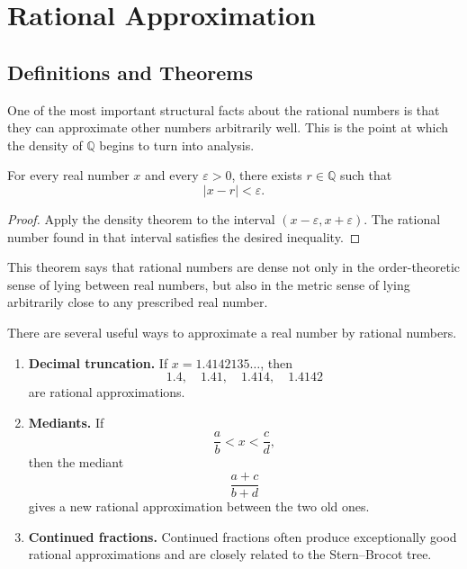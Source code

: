 
\section{Rational Approximation}
\label{sec:rational-approximation}

\subsection{Definitions and Theorems}

One of the most important structural facts about the rational numbers is that they can approximate
other numbers arbitrarily well.  This is the point at which the density of $\mathbb{Q}$ begins to turn
into analysis.

\begin{theorem}
\label{thm:rational-approximation}
For every real number $x$ and every $\varepsilon>0$, there exists $r\in\mathbb{Q}$ such that
\[
|x-r|<\varepsilon.
\]
\end{theorem}

\begin{proof}
Apply the density theorem to the interval $(x-\varepsilon,x+\varepsilon)$.  The rational number found
in that interval satisfies the desired inequality.
\end{proof}

\begin{remark}
This theorem says that rational numbers are dense not only in the order-theoretic sense of lying
between real numbers, but also in the metric sense of lying arbitrarily close to any prescribed real
number.
\end{remark}

\begin{remark}
There are several useful ways to approximate a real number by rational numbers.
\begin{enumerate}
  \item \textbf{Decimal truncation.}  If $x=1.4142135\dots$, then
  \[
  1.4,\quad 1.41,\quad 1.414,\quad 1.4142
  \]
  are rational approximations.
  \item \textbf{Mediants.}  If
  \[
  \frac{a}{b}<x<\frac{c}{d},
  \]
  then the mediant
  \[
  \frac{a+c}{b+d}
  \]
  gives a new rational approximation between the two old ones.
  \item \textbf{Continued fractions.}  Continued fractions often produce exceptionally good rational
  approximations and are closely related to the Stern--Brocot tree.
\end{enumerate}
\end{remark}

